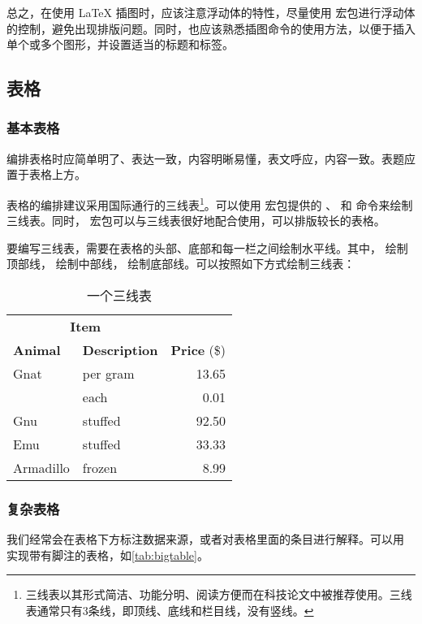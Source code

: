 总之，在使用 \LaTeX{} 插图时，应该注意浮动体的特性，尽量使用  宏包进行浮动体的控制，避免出现排版问题。同时，也应该熟悉插图命令的使用方法，以便于插入单个或多个图形，并设置适当的标题和标签。


\subsection{表格}

\subsubsection{基本表格}

编排表格时应简单明了、表达一致，内容明晰易懂，表文呼应，内容一致。表题应置于表格上方。

表格的编排建议采用国际通行的三线表\footnote{三线表以其形式简洁、功能分明、阅读方便而在科技论文中被推荐使用。三线表通常只有3条线，即顶线、底线和栏目线，没有竖线。}。可以使用  宏包提供的 、 和  命令来绘制三线表。同时， 宏包可以与三线表很好地配合使用，可以排版较长的表格。

要编写三线表，需要在表格的头部、底部和每一栏之间绘制水平线。其中， 绘制顶部线， 绘制中部线， 绘制底部线。可以按照如下方式绘制三线表：
\begin{table}[!hpt]
  \caption{一个三线表}
  \label{tab:firstone}
  \centering
  \begin{tabular}{@{}llr@{}} \toprule
    \multicolumn{2}{c}{\textbf{Item}} \\ \cmidrule(r){1-2}
    \textbf{Animal} & \textbf{Description} & \textbf{Price} (\$)\\ \midrule
    Gnat  & per gram  & 13.65 \\
          & each      & 0.01 \\
    Gnu   & stuffed   & 92.50 \\
    Emu   & stuffed   & 33.33 \\
    Armadillo & frozen & 8.99 \\ \bottomrule
  \end{tabular}
\end{table}

\subsubsection{复杂表格}

我们经常会在表格下方标注数据来源，或者对表格里面的条目进行解释。可以用
 实现带有脚注的表格，如\cref{tab:bigtable}。

